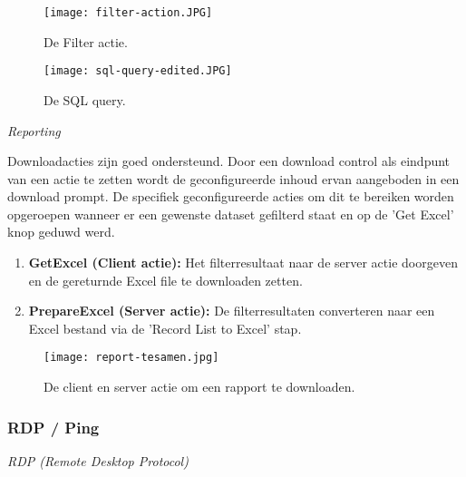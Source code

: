 \begin{figure}[h!]
    \centering
    \texttt{[image: filter-action.JPG]}
    \caption{De Filter actie.}
    \label{fig:filter-action}
\end{figure}

\begin{figure}[h!]
    \centering
    \texttt{[image: sql-query-edited.JPG]}
    \caption{De SQL query.}
    \label{fig:sql-query}
\end{figure}

\textit{Reporting}

Downloadacties zijn goed ondersteund. Door een download control als eindpunt van een actie te zetten wordt de geconfigureerde inhoud ervan aangeboden in een download prompt. De specifiek geconfigureerde acties om dit te bereiken worden opgeroepen wanneer er een gewenste dataset gefilterd staat en op de 'Get Excel' knop geduwd werd.
\begin{enumerate}
    \item \textbf{GetExcel (Client actie):} Het filterresultaat naar de server actie doorgeven en de gereturnde Excel file te downloaden zetten.
    \item \textbf{PrepareExcel (Server actie):} De filterresultaten converteren naar een Excel bestand via de 'Record List to Excel' stap.
\end{enumerate}


\begin{figure}[h!]
    \centering
    \texttt{[image: report-tesamen.jpg]}
    \caption{De client en server actie om een rapport te downloaden.}
    \label{fig:report-tesamen}
\end{figure}

\subsubsection{RDP / Ping}

\textit{RDP (Remote Desktop Protocol)}

